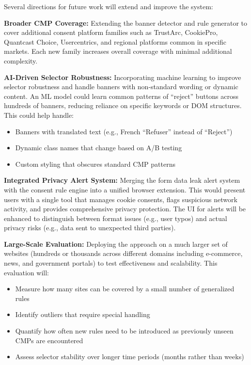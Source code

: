 \documentclass[conference]{IEEEtran}
\begin{document}
Several directions for future work will extend and improve the system:

\textbf{Broader CMP Coverage:} Extending the banner detector and rule generator to cover additional consent platform families such as TrustArc, CookiePro, Quantcast Choice, Usercentrics, and regional platforms common in specific markets. Each new family increases overall coverage with minimal additional complexity.

\textbf{AI-Driven Selector Robustness:} Incorporating machine learning to improve selector robustness and handle banners with non-standard wording or dynamic content. An ML model could learn common patterns of ``reject'' buttons across hundreds of banners, reducing reliance on specific keywords or DOM structures. This could help handle:

\begin{itemize}

    \item Banners with translated text (e.g., French ``Refuser'' instead of ``Reject'')

    \item Dynamic class names that change based on A/B testing

    \item Custom styling that obscures standard CMP patterns

\end{itemize}

\textbf{Integrated Privacy Alert System:} Merging the form data leak alert system with the consent rule engine into a unified browser extension. This would present users with a single tool that manages cookie consents, flags suspicious network activity, and provides comprehensive privacy protection. The UI for alerts will be enhanced to distinguish between format issues (e.g., user typos) and actual privacy risks (e.g., data sent to unexpected third parties).

\textbf{Large-Scale Evaluation:} Deploying the approach on a much larger set of websites (hundreds or thousands across different domains including e-commerce, news, and government portals) to test effectiveness and scalability. This evaluation will:

\begin{itemize}

    \item Measure how many sites can be covered by a small number of generalized rules

    \item Identify outliers that require special handling

    \item Quantify how often new rules need to be introduced as previously unseen CMPs are encountered

    \item Assess selector stability over longer time periods (months rather than weeks)

\end{itemize}
\end{document}
